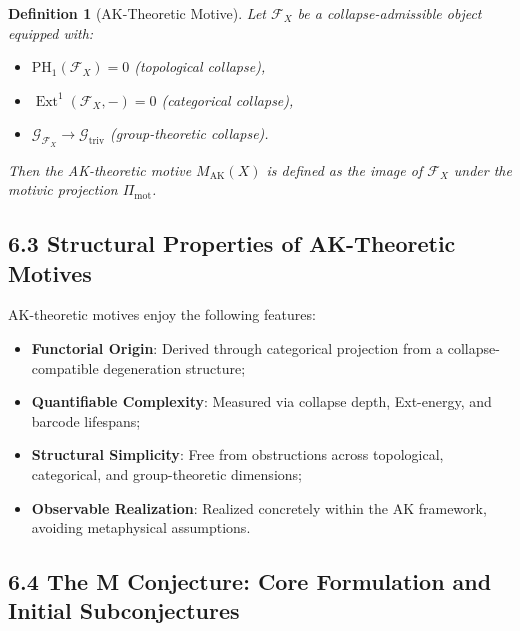 \documentclass[11pt]{article}
\newtheorem{definition}[theorem]{Definition}
\DeclareMathOperator{\Ext}{Ext}
\begin{document}
\begin{definition}[AK-Theoretic Motive]
Let $\mathcal{F}_X$ be a collapse-admissible object equipped with:
\begin{itemize}
    \item $\mathrm{PH}_1(\mathcal{F}_X) = 0$ (topological collapse),
    \item $\Ext^1(\mathcal{F}_X, -) = 0$ (categorical collapse),
    \item $\mathcal{G}_{\mathcal{F}_X} \rightarrow \mathcal{G}_{\mathrm{triv}}$ (group-theoretic collapse).
\end{itemize}
Then the \emph{AK-theoretic motive} $M_{\mathrm{AK}}(X)$ is defined as the image of $\mathcal{F}_X$ under the motivic projection $\Pi_{\mathrm{mot}}$.
\end{definition}

\subsection{6.3 Structural Properties of AK-Theoretic Motives}

AK-theoretic motives enjoy the following features:

\begin{itemize}
    \item \textbf{Functorial Origin}: Derived through categorical projection from a collapse-compatible degeneration structure;
    \item \textbf{Quantifiable Complexity}: Measured via collapse depth, Ext-energy, and barcode lifespans;
    \item \textbf{Structural Simplicity}: Free from obstructions across topological, categorical, and group-theoretic dimensions;
    \item \textbf{Observable Realization}: Realized concretely within the AK framework, avoiding metaphysical assumptions.
\end{itemize}

\subsection{6.4 The M Conjecture: Core Formulation and Initial Subconjectures}
\end{document}
